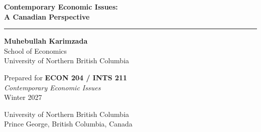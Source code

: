 \documentclass[12pt,twoside,openright]{book}
\theoremstyle{definition}
\begin{document}

\frontmatter
\pagestyle{empty}

\begin{titlepage}

\vspace*{2.2cm}

\begin{center}
  {\color{white}\fontsize{28}{34}\selectfont\bfseries
    Contemporary Economic Issues:\\[6pt]
    A Canadian Perspective}

  \vspace{1cm}
  \color{unbcgreen}
  \rule{0.85\textwidth}{1.5pt}

  \vspace{1cm}
  {\Large\bfseries\color{black} Muhebullah Karimzada}\\[6pt]
  {\large\color{chaptergray} School of Economics}\\[4pt]
  {\large\color{chaptergray} University of Northern British Columbia}

  \vspace{1.5cm}
  {\normalsize\color{chaptergray}
    Prepared for \textbf{ECON 204 / INTS 211}\\
    \textit{Contemporary Economic Issues}\\[4pt]
    Winter 2027}

  \vfill
  {\small\color{chaptergray}
    University of Northern British Columbia\\
    Prince George, British Columbia, Canada}
\end{center}
\end{titlepage}
\end{document}
